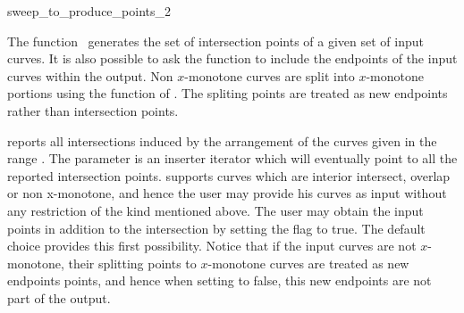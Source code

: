 

\begin{ccRefFunction}{sweep_to_produce_points_2}  %


\ccDefinition
  
The function \ccRefName\ generates the set of intersection points of a
given set of input curves. It is also possible to ask the function to
include the endpoints of the input curves within the output.
Non $x$-monotone curves are split into $x$-monotone portions using the  
function of . The spliting points are treated as new endpoints rather than 
intersection points.


   {reports all intersections induced by the arrangement of the curves
   given in the range \ccStyle{[curves_begin, curves_end)}. The
   parameter  is an inserter iterator which 
   will eventually point to all the reported intersection points. 
    supports
   curves which are interior intersect, overlap or non x-monotone, and
   hence the user may provide his curves as input without any
   restriction of the kind mentioned above. 
   The user may obtain the input points in addition to the intersection 
   by setting the flag  to true. 
   The default choice provides this first possibility. 
   Notice that if the input curves are not $x$-monotone, their splitting points 
   to $x$-monotone curves are treated as new endpoints points, and hence 
   when setting  to false, this new endpoints are not part 
   of the output.}


\end{ccRefFunction}
